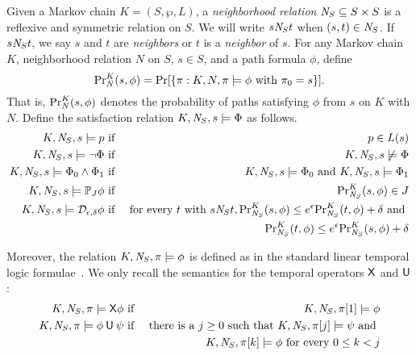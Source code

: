 
Given a Markov chain $K = (S, \wp, L)$, a
\emph{neighborhood relation} $\neighbor{S} \subseteq S \times S$
is a reflexive and symmetric relation on $S$. We will write $s
\neighbor{S} t$ when $(s, t) \in \neighbor{S}$. If $s \neighbor{S} t$,
we say $s$ and $t$ are \emph{neighbors} or $t$ is a \emph{neighbor} of
$s$. 
For any Markov chain $K$, neighborhood
relation $N$ on $S$, $s \in S$, and a path formula $\phi$,
define
\[
\myPr{s}{K}{N}{\phi} =
\Pr [ \{ \pi : K, N, \pi \models \phi \textmd{ with } \pi_0 = s \} ].
\]
That is, $\myPr{s}{K}{N}{\phi}$ denotes the probability of paths
satisfying $\phi$ from $s$ on $K$ with $N$. 
Define the satisfaction relation $K, \neighbor{S}, s
\models \Phi$ as follows.
\begin{eqnarray*}
  K, \neighbor{S}, s \models p
  & \textmd{ if } &
  p \in L(s)\\
  K, \neighbor{S}, s \models \neg \Phi
  & \textmd{ if } &
  K, \neighbor{S}, s \not\models \Phi\\
  K, \neighbor{S}, s \models \Phi_0 \wedge \Phi_1
  & \textmd{ if } &
  K, \neighbor{S}, s \models \Phi_0 \textmd{ and }
  K, \neighbor{S}, s \models \Phi_1\\
  K, \neighbor{S}, s \models \PJ{J} \phi
  & \textmd{ if } &
                    \myPr{s}{K}{\neighbor{S}}{\phi} \in J\\
  K, \neighbor{S}, s \models \dpriv{\epsilon}{\delta} \phi
  & \textmd{ if } &
  \textmd{for every } t \textmd{ with }  s \neighbor{S} t,
      \myPr{s}{K}{\neighbor{S}}{\phi} \leq e^{\epsilon}
      \myPr{t}{K}{\neighbor{S}}{\phi} + \delta
      \textmd{ and }\\
  & &  \myPr{t}{K}{\neighbor{S}}{\phi} \leq e^{\epsilon}
       \myPr{s}{K}{\neighbor{S}}{\phi} + \delta
\end{eqnarray*}

Moreover, the relation $K, \neighbor{S}, \pi \models \phi$ is defined as
in the standard linear temporal logic formulae~\cite{ManneP92}. We only recall the semantics for the temporal operators $\X$ and $\until$:
\begin{eqnarray*}
  K, \neighbor{S}, \pi \models \X \phi
  & \textmd{ if } &
  K, \neighbor{S}, \pi[1] \models \phi\\
  K, \neighbor{S}, \pi \models \phi \until \psi
  & \textmd{ if } &
  \textmd{there is a } j \geq 0 \textmd{ such that }
  K, \neighbor{S}, \pi[j] \models \psi \textmd{ and } \\
  & & K, \neighbor{S}, \pi[k] \models \phi
      \textmd{ for every } 0 \leq k < j
\hide{
  K, \neighbor{S}, \pi \models \Phi \buntil{n} \Psi
  & \textmd{ if } &
  \textmd{there is a } 0 \leq j \leq n \textmd{ such that }
  K, \neighbor{S}, \pi[j] \models \Psi \textmd{ and } \\
  & & K, \neighbor{S}, \pi[k] \models \Phi
      \textmd{ for every } 0 \leq k < j
}
\end{eqnarray*}

